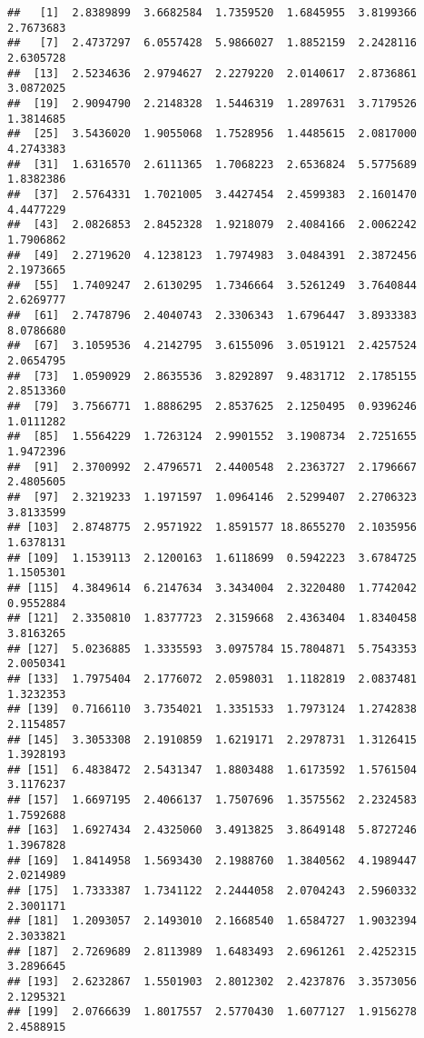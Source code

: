 \documentclass[
]{article}
\begin{document}
\begin{verbatim}
##   [1]  2.8389899  3.6682584  1.7359520  1.6845955  3.8199366  2.7673683
##   [7]  2.4737297  6.0557428  5.9866027  1.8852159  2.2428116  2.6305728
##  [13]  2.5234636  2.9794627  2.2279220  2.0140617  2.8736861  3.0872025
##  [19]  2.9094790  2.2148328  1.5446319  1.2897631  3.7179526  1.3814685
##  [25]  3.5436020  1.9055068  1.7528956  1.4485615  2.0817000  4.2743383
##  [31]  1.6316570  2.6111365  1.7068223  2.6536824  5.5775689  1.8382386
##  [37]  2.5764331  1.7021005  3.4427454  2.4599383  2.1601470  4.4477229
##  [43]  2.0826853  2.8452328  1.9218079  2.4084166  2.0062242  1.7906862
##  [49]  2.2719620  4.1238123  1.7974983  3.0484391  2.3872456  2.1973665
##  [55]  1.7409247  2.6130295  1.7346664  3.5261249  3.7640844  2.6269777
##  [61]  2.7478796  2.4040743  2.3306343  1.6796447  3.8933383  8.0786680
##  [67]  3.1059536  4.2142795  3.6155096  3.0519121  2.4257524  2.0654795
##  [73]  1.0590929  2.8635536  3.8292897  9.4831712  2.1785155  2.8513360
##  [79]  3.7566771  1.8886295  2.8537625  2.1250495  0.9396246  1.0111282
##  [85]  1.5564229  1.7263124  2.9901552  3.1908734  2.7251655  1.9472396
##  [91]  2.3700992  2.4796571  2.4400548  2.2363727  2.1796667  2.4805605
##  [97]  2.3219233  1.1971597  1.0964146  2.5299407  2.2706323  3.8133599
## [103]  2.8748775  2.9571922  1.8591577 18.8655270  2.1035956  1.6378131
## [109]  1.1539113  2.1200163  1.6118699  0.5942223  3.6784725  1.1505301
## [115]  4.3849614  6.2147634  3.3434004  2.3220480  1.7742042  0.9552884
## [121]  2.3350810  1.8377723  2.3159668  2.4363404  1.8340458  3.8163265
## [127]  5.0236885  1.3335593  3.0975784 15.7804871  5.7543353  2.0050341
## [133]  1.7975404  2.1776072  2.0598031  1.1182819  2.0837481  1.3232353
## [139]  0.7166110  3.7354021  1.3351533  1.7973124  1.2742838  2.1154857
## [145]  3.3053308  2.1910859  1.6219171  2.2978731  1.3126415  1.3928193
## [151]  6.4838472  2.5431347  1.8803488  1.6173592  1.5761504  3.1176237
## [157]  1.6697195  2.4066137  1.7507696  1.3575562  2.2324583  1.7592688
## [163]  1.6927434  2.4325060  3.4913825  3.8649148  5.8727246  1.3967828
## [169]  1.8414958  1.5693430  2.1988760  1.3840562  4.1989447  2.0214989
## [175]  1.7333387  1.7341122  2.2444058  2.0704243  2.5960332  2.3001171
## [181]  1.2093057  2.1493010  2.1668540  1.6584727  1.9032394  2.3033821
## [187]  2.7269689  2.8113989  1.6483493  2.6961261  2.4252315  3.2896645
## [193]  2.6232867  1.5501903  2.8012302  2.4237876  3.3573056  2.1295321
## [199]  2.0766639  1.8017557  2.5770430  1.6077127  1.9156278  2.4588915

\end{verbatim}
\end{document}
